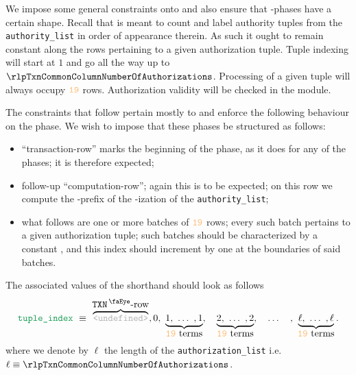 \begin{center}
\end{center}
We impose some general constraints onto \locAuthorizationIndex{}
and also ensure that \phaseAuthorizationList{}-phases have a certain shape.
Recall that \locAuthorizationIndex{} is meant to count and label authority tuples from the \texttt{authority\_list}
in order of appearance therein.
As such it ought to remain constant along the rows pertaining to a given authorization tuple.
Tuple indexing will start at $1$ and go all the way up to $\rlpTxnCommonColumnNumberOfAuthorizations$.
Processing of a given tuple will always occupy $\locAuthorizationNumberOfRows$ rows.
Authorization validity will be checked in the \rlpAuthMod{} module.

The constraints that follow pertain mostly to
\locAuthorizationIndex{} and enforce the following behaviour
on the \phaseAuthorizationList{} phase.
We wish to impose that these phases be structured as follows:
\begin{itemize}
	\item
		 ``transaction-row'' marks the beginning of
		the \phaseAuthorizationList{} phase, as it
		does for any of the phases;
		it is therefore expected;
	\item
		 follow-up ``computation-row'';
		again this is to be expected;
		on this row we compute the
		\rlp{}-prefix of the \rlp{}-ization of the
		\texttt{authority\_list};
	\item
		what follows are one or more batches of $\locAuthorizationNumberOfRows$ rows;
		every such batch pertains to a given authorization tuple;
		such batches should be characterized by a constant
		\locAuthorizationIndex{}, and this index should
		increment by one at the boundaries of said batches.
\end{itemize}
\label{rlp txn: phase constraints: authorization list: constraints: authorization lists must be nonempty}
The associated values of the \locAuthorizationIndex{} shorthand should look as follows
\[
	\locAuthorizationIndex
	~ \equiv ~
	\overbrace{\leftUndefined}^{\displaystyle \isTxn\text{-row}} , 0, ~
	\underbrace{1,    ~ \dots{} ~ , 1    } _{\displaystyle \locAuthorizationNumberOfRows \text{ terms}}, \quad
	\underbrace{2,    ~ \dots{} ~ , 2    } _{\displaystyle \locAuthorizationNumberOfRows \text{ terms}}, \quad \dots \quad, ~
	\underbrace{\ell, ~ \dots{} ~ , \ell } _{\displaystyle \locAuthorizationNumberOfRows \text{ terms}}.
\]
where we denote by $\ell$ the length of the \texttt{authorization\_list} i.e. $\ell \equiv \rlpTxnCommonColumnNumberOfAuthorizations$.


